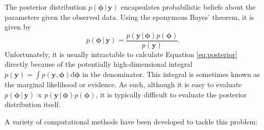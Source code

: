\documentclass[a4paper, nobind]{templates/ociamthesis}
\begin{document}
The posterior distribution \(p(\boldsymbol{\mathbf{\phi}} \, | \, \mathbf{y})\) encapsulates probabilistic beliefs about the parameters given the observed data.
Using the eponymous Bayes' theorem, it is given by
\begin{equation}
p(\boldsymbol{\mathbf{\phi}} \, | \, \mathbf{y}) = \frac{p(\mathbf{y} \, | \, \boldsymbol{\mathbf{\phi}}) p(\boldsymbol{\mathbf{\phi}})}{p(\mathbf{y})}. \label{eq:posterior}
\end{equation}
Unfortunately, it is usually intractable to calculate Equation \eqref{eq:posterior} directly because of the potentially high-dimensional integral \(p(\mathbf{y}) = \int p(\mathbf{y}, \boldsymbol{\mathbf{\phi}}) \text{d}\boldsymbol{\mathbf{\phi}}\) in the denominator.
This integral is sometimes known as the marginal likelihood or evidence.
As such, although it is easy to evaluate \(p(\boldsymbol{\mathbf{\phi}} \, | \, \mathbf{y}) \propto p(\mathbf{y} \, | \, \boldsymbol{\mathbf{\phi}}) p(\boldsymbol{\mathbf{\phi}})\), it is typically difficult to evaluate the posterior distribution itself.

A variety of computational methods have been developed to tackle this problem:
\end{document}

